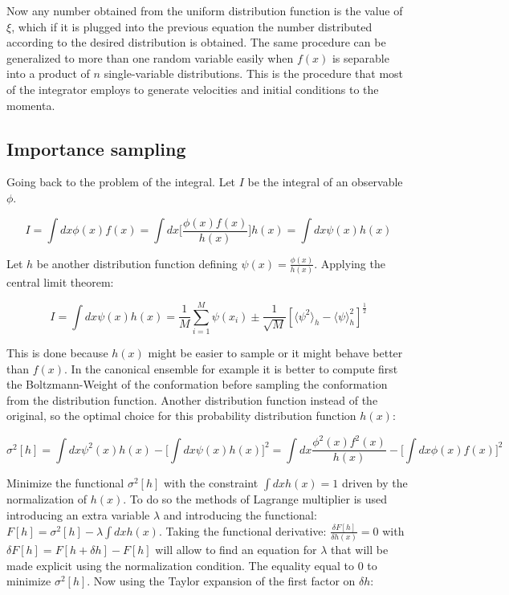 		Now any number obtained from the uniform distribution function is the value of $\xi$, which if it is plugged into the previous equation the number distributed according to the desired distribution is obtained.
		The same procedure can be generalized to more than one random variable easily when $f(x)$ is separable into a product of $n$ single-variable distributions.
		This is the procedure that most of the integrator employs to generate velocities and initial conditions to the momenta.

	\subsection{Importance sampling}
	Going back to the problem of the integral.
	Let $I$ be the integral of an observable $\phi$.

	$$I = \int dx\phi(x)f(x) = \int dx\biggl[\frac{\phi(x)f(x)}{h(x)}\biggr]h(x) = \int dx\psi(x)h(x)$$

	Let $h$ be another distribution function defining $\psi(x) = \frac{\phi(x)}{h(x)}$.
	Applying the central limit theorem:

	$$I = \int dx\psi(x)h(x) = \frac{1}{M}\sum\limits_{i=1}^M\psi(x_i)\pm\frac{1}{\sqrt{M}}[\langle\psi^2\rangle_h-\langle\psi\rangle_h^2]^{\frac{1}{2}}$$

	This is done because $h(x)$ might be easier to sample or it might behave better than $f(x)$.
	In the canonical ensemble for example it is better to compute first the Boltzmann-Weight of the conformation before sampling the conformation from the distribution function.
	Another distribution function instead of the original, so the optimal choice for this probability distribution function $h(x)$:

	$$\sigma^2[h] = \int dx\psi^2(x)h(x) - \biggl[\int dx\psi(x)h(x)\biggr]^2 = \int dx\frac{\phi^2(x)f^2(x)}{h(x)}-\biggl[\int dx\phi(x)f(x)\biggr]^2$$

	Minimize the functional $\sigma^2[h]$ with the constraint $\int dx h(x) = 1$ driven by the normalization of $h(x)$.
	To do so the methods of	Lagrange multiplier is used introducing an extra variable $\lambda$ and introducing the functional: $F[h] = \sigma^2[h]-\lambda\int dxh(x)$.
	Taking the functional derivative: $\frac{\delta F[h]}{\delta h(x)} = 0$ with $\delta F[h] = F[h+\delta h]-F[h]$ will allow to find an equation for $\lambda$ that will be made explicit using the normalization condition.
	The equality equal to $0$ to minimize $\sigma^2[h]$.
	Now using the Taylor expansion of the first factor on $\delta h$:

